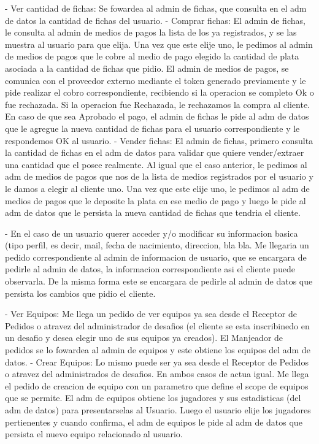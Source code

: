 - Ver cantidad de fichas: Se fowardea al admin de fichas, que consulta en el adm de datos la cantidad de fichas del usuario.
- Comprar fichas: El admin de fichas, le consulta al admin de medios de pagos la lista de los ya registrados, y se las muestra al usuario para que elija. Una vez que este elije uno, le pedimos al admin de medios de pagos que le cobre al medio de pago elegido la cantidad de plata asociada a la cantidad de fichas que pidio. El admin de medios de pagos, se comunica con el proveedor externo mediante el token generado previamente y le pide realizar el cobro correspondiente, recibiendo si la operacion se completo Ok o fue rechazada. Si la operacion fue Rechazada, le rechazamos la compra al cliente. En caso de que sea Aprobado el pago, el admin de fichas le pide al adm de datos que le agregue la nueva cantidad de fichas para el usuario correspondiente y le respondemos OK al usuario.
- Vender fichas: El admin de fichas, primero consulta la cantidad de fichas en el adm de datos para validar que quiere vender/extraer una cantidad que el posee realmente. Al igual que el caso anterior, le pedimos al adm de medios de pagos que nos de la lista de medios registrados por el usuario y le damos a elegir al cliente uno. Una vez que este elije uno, le pedimos al adm de medios de pagos que le deposite la plata en ese medio de pago y luego le pide al adm de datos que le persista la nueva cantidad de fichas que tendria el cliente.

- En el caso de un usuario querer acceder y/o modificar su informacion basica (tipo perfil, es decir, mail, fecha de nacimiento, direccion, bla bla. Me llegaria un pedido correspondiente al admin de informacion de usuario, que se encargara de pedirle al admin de datos, la informacion correspondiente asi el cliente puede observarla. De la misma forma este se encargara de pedirle al admin de datos que persista los cambios que pidio el cliente.

- Ver Equipos: Me llega un pedido de ver equipos ya sea desde el Receptor de Pedidos o atravez del administrador de desafios (el cliente se esta inscribinedo en un desafio y desea elegir uno de sus equipos ya creados). El Manjeador de pedidos se lo fowardea al admin de equipos y este obtiene los equipos del adm de datos.
- Crear Equipos: Lo mismo puede ser ya sea desde el Receptor de Pedidos o atravez del administrados de desafios. En ambos casos de actua igual. Me llega el pedido de creacion de equipo con un parametro que define el scope de equipos que se permite. El adm de equipos obtiene los jugadores y sus estadisticas (del adm de datos) para presentarselas al Usuario. Luego el usuario elije los jugadores pertienentes y cuando confirma, el adm de equipos le pide al adm de datos que persista el nuevo equipo relacionado al usuario.


